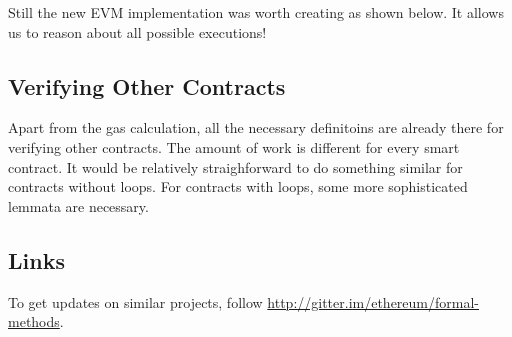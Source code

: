 \documentclass[11pt,a4paper]{article}
\begin{document}
Still the new EVM implementation was worth creating as shown below.
It allows us to reason about all possible executions!

\subsection{Verifying Other Contracts}

Apart from the gas calculation, all the necessary definitoins are
already there for verifying other contracts.  The amount of work is
different for every smart contract.  It would be relatively
straighforward to do something similar for
contracts without loops.  For contracts with loops, some more
sophisticated lemmata are necessary.

\subsection{Links}

To get updates on similar projects, follow \url{http://gitter.im/ethereum/formal-methods}.



%
%
\end{document}
